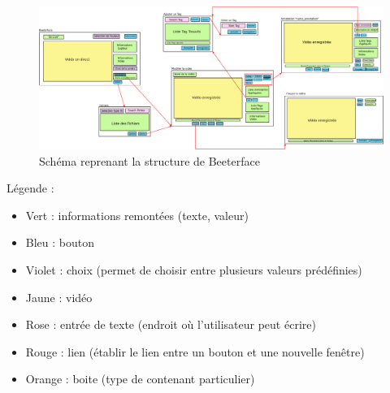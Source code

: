 \documentclass[11pt,french,a4paper]{report}
\begin{document}
\begin{landscape}
\begin{figure}[!h]
\begin{center}
\includegraphics[scale=0.3]{../images/dia/schema_interface.png}
    \caption{Schéma reprenant la structure de Beeterface}
    \label{sch_beeterface}
\end{center}
\end{figure}

\Large Légende : \normalsize \\ 
    \begin{multicols}{2}
        \begin{itemize}[label=, leftmargin=*,parsep=0cm,itemsep=0cm,topsep=0cm]
        \item Vert : informations remontées (texte, valeur)
        \item Bleu : bouton
        \item Violet : choix (permet de choisir entre plusieurs valeurs prédéfinies)
        \item Jaune : vidéo
        \item Rose : entrée de texte (endroit où l'utilisateur peut écrire)
        \item Rouge : lien (établir le lien entre un bouton et une nouvelle fenêtre)
        \item Orange : boite (type de contenant particulier)
    \end{itemize}
    \end{multicols}
\end{landscape}
    \setlength{\columnseprule}{0,1}

\dotfill \\
\end{document}
